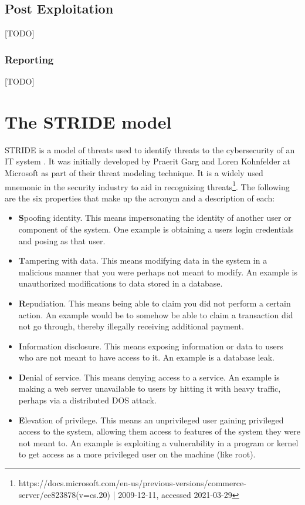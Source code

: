 \subsection{Post Exploitation}
[TODO]

\subsubsection{Reporting}
[TODO]

\section{The STRIDE model} \label{ch:method:stride}
STRIDE is a model of threats used to identify threats to the cybersecurity of an IT system \cite{stride}. It was initially developed by Praerit Garg and Loren Kohnfelder at Microsoft as part of their threat modeling technique. It is a widely used mnemonic in the security industry to aid in recognizing threats\footnote{https://docs.microsoft.com/en-us/previous-versions/commerce-server/ee823878(v=cs.20) | 2009-12-11, accessed 2021-03-29}. The following are the six properties that make up the acronym and a description of each:
\begin{itemize}
    \item \textbf{S}poofing identity. This means impersonating the identity of another user or component of the system. One example is obtaining a users login credentials and posing as that user.
    \item \textbf{T}ampering with data. This means modifying data in the system in a malicious manner that you were perhaps not meant to modify. An example is unauthorized modifications to data stored in a database.
    \item \textbf{R}epudiation. This means being able to claim you did not perform a certain action. An example would be to somehow be able to claim a transaction did not go through, thereby illegally receiving additional payment.
    \item \textbf{I}nformation disclosure. This means exposing information or data to users who are not meant to have access to it. An example is a database leak.
    \item \textbf{D}enial of service. This means denying access to a service. An example is making a web server unavailable to users by hitting it with heavy traffic, perhaps via a distributed \gls{DOS} attack.
    \item \textbf{E}levation of privilege. This means an unprivileged user gaining privileged access to the system, allowing them access to features of the system they were not meant to. An example is exploiting a vulnerability in a program or kernel to get access as a more privileged user on the machine (like root).
\end{itemize}
